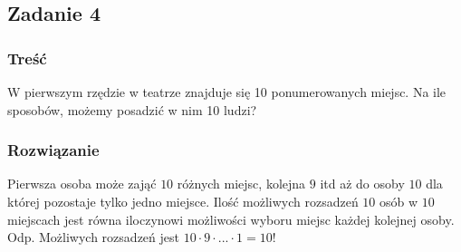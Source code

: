 \subsection{Zadanie 4}

\subsubsection*{Treść}
W pierwszym rzędzie w teatrze znajduje się 10 ponumerowanych miejsc. Na ile sposobów, możemy posadzić w nim 10 ludzi?


\subsubsection*{Rozwiązanie}
Pierwsza osoba może zająć $10$ różnych miejsc, kolejna $9$ itd aż do osoby $10$ dla której pozostaje tylko jedno miejsce. Ilość możliwych rozsadzeń $10$ osób w $10$ miejscach jest równa iloczynowi możliwości wyboru miejsc każdej kolejnej osoby.
\\
Odp. Możliwych rozsadzeń jest $10 \cdot 9 \cdot . . . \cdot 1 = 10!$

